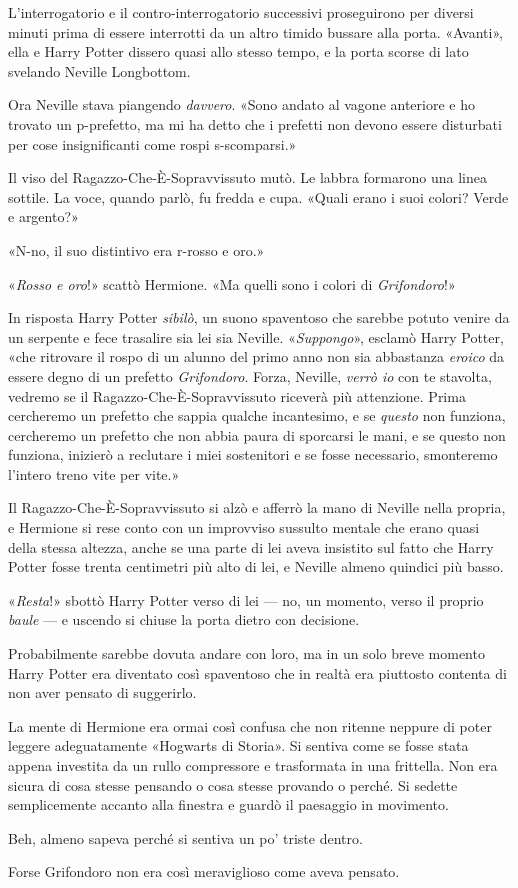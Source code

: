 L’interrogatorio e il contro-interrogatorio successivi proseguirono per diversi minuti prima di essere interrotti da un altro timido bussare alla porta. «Avanti», ella e Harry Potter dissero quasi allo stesso tempo, e la porta scorse di lato svelando Neville Longbottom.

Ora Neville stava piangendo \textit{davvero}. «Sono andato al vagone anteriore e ho trovato un p-prefetto, ma mi ha detto che i prefetti non devono essere disturbati per cose insignificanti come rospi s-scomparsi.»

Il viso del Ragazzo-Che-È-Sopravvissuto mutò. Le labbra formarono una linea sottile. La voce, quando parlò, fu fredda e cupa. «Quali erano i suoi colori? Verde e argento?»

«N-no, il suo distintivo era r-rosso e oro.»

«\textit{Rosso e oro}!» scattò Hermione. «Ma quelli sono i colori di \textit{Grifondoro}!»

In risposta Harry Potter \textit{sibilò}, un suono spaventoso che sarebbe potuto venire da un serpente e fece trasalire sia lei sia Neville. «\textit{Suppongo}», esclamò Harry Potter, «che ritrovare il rospo di un alunno del primo anno non sia abbastanza \textit{eroico} da essere degno di un prefetto \textit{Grifondoro}. Forza, Neville, \textit{verrò io} con te stavolta, vedremo se il Ragazzo-Che-È-Sopravvissuto riceverà più attenzione. Prima cercheremo un prefetto che sappia qualche incantesimo, e se \textit{questo} non funziona, cercheremo un prefetto che non abbia paura di sporcarsi le mani, e se questo non funziona, inizierò a reclutare i miei sostenitori e se fosse necessario, smonteremo l’intero treno vite per vite.»

Il Ragazzo-Che-È-Sopravvissuto si alzò e afferrò la mano di Neville nella propria, e Hermione si rese conto con un improvviso sussulto mentale che erano quasi della stessa altezza, anche se una parte di lei aveva insistito sul fatto che Harry Potter fosse trenta centimetri più alto di lei, e Neville almeno quindici più basso.

«\textit{Resta}!» sbottò Harry Potter verso di lei — no, un momento, verso il proprio \textit{baule} — e uscendo si chiuse la porta dietro con decisione.

Probabilmente sarebbe dovuta andare con loro, ma in un solo breve momento Harry Potter era diventato così spaventoso che in realtà era piuttosto contenta di non aver pensato di suggerirlo.

La mente di Hermione era ormai così confusa che non ritenne neppure di poter leggere adeguatamente «Hogwarts di Storia». Si sentiva come se fosse stata appena investita da un rullo compressore e trasformata in una frittella. Non era sicura di cosa stesse pensando o cosa stesse provando o perché. Si sedette semplicemente accanto alla finestra e guardò il paesaggio in movimento.

Beh, almeno sapeva perché si sentiva un po’ triste dentro.

Forse Grifondoro non era così meraviglioso come aveva pensato.



